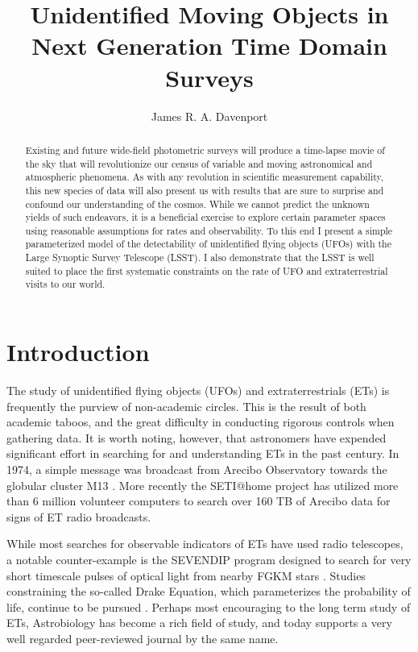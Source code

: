 \documentclass[iop]{emulateapj}
\begin{document}
\title{Unidentified Moving Objects in Next Generation Time Domain Surveys}
\author{James R. A. Davenport}



\begin{abstract}
Existing and future wide-field photometric surveys will produce a time-lapse movie of the sky that will revolutionize our census of variable and moving astronomical and atmospheric phenomena. As with any revolution in scientific measurement capability, this new species of data will also present us with results that are sure to surprise and confound our understanding of the cosmos. While we cannot predict the unknown yields of such endeavors, it is a beneficial exercise to explore certain parameter spaces using reasonable assumptions for rates and observability. To this end I present a simple parameterized model of the detectability of unidentified flying objects (UFOs) with the Large Synoptic Survey Telescope (LSST). I also demonstrate that the LSST is well suited to place the first systematic constraints on the rate of UFO and extraterrestrial visits to our world.
\end{abstract}


\section{Introduction}

The study of unidentified flying objects (UFOs) and extraterrestrials (ETs) is frequently the purview of non-academic circles. This is the result of both academic taboos, and the great difficulty in conducting rigorous controls when gathering data. %
It is worth noting, however, that astronomers have expended significant effort in searching for and understanding ETs in the past century. In 1974, a simple message was broadcast from Arecibo Observatory towards the globular cluster M13 \citep{1975Icar...26..462}. More recently the SETI@home project \citep{setiathome} has utilized more than 6 million volunteer computers to search over 160 TB of Arecibo data for signs of ET radio broadcasts. 

While most searches for observable indicators of ETs have used radio telescopes, a notable counter-example is the SEVENDIP program designed to search for very short timescale pulses of optical light from nearby FGKM stars \citep{2001SPIE.4273..104W}. 
Studies constraining the so-called Drake Equation, which parameterizes the probability of life,  continue to be pursued \citep[e.g.][]{2004AsBio...4..225C,2008ASPC..395..213D}. Perhaps most encouraging to the long term study of ETs, Astrobiology has become a rich field of study, and today  supports a very well regarded peer-reviewed journal by the same name.
\end{document}
